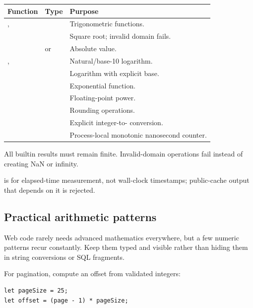 \begin{center}
\begin{tabularx}{\textwidth}{@{}l l Y@{}}
\toprule
\textbf{Function} & \textbf{Type} & \textbf{Purpose} \\
\midrule
{},  &  & Trigonometric functions. \\
 &  & Square root; invalid domain fails. \\
 &  or  & Absolute value. \\
,  &  & Natural/base-10 logarithm. \\
 &  & Logarithm with explicit base. \\
 &  & Exponential function. \\
 &  & Floating-point power. \\
 &  & Rounding operations. \\
 &  & Explicit integer-to- conversion. \\
 &  & Process-local monotonic nanosecond counter. \\
\bottomrule
\end{tabularx}
\end{center}

All  builtin results must remain finite. Invalid-domain operations fail instead of creating NaN or infinity.\par
{} is for elapsed-time measurement, not wall-clock timestamps; public-cache output that depends on it is rejected.

\subsection*{Practical arithmetic patterns}

Web code rarely needs advanced mathematics everywhere, but a few numeric patterns recur constantly. Keep them typed and visible rather than hiding them in string conversions or SQL fragments.

For pagination, compute an offset from validated integers:

\begin{lstlisting}[language=RWLang]
let pageSize = 25;
let offset = (page - 1) * pageSize;
\end{lstlisting}

